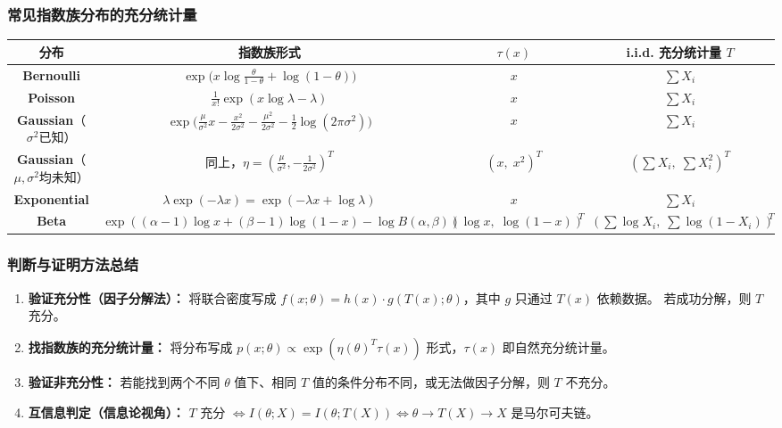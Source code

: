 \documentclass[12pt,a4paper]{ctexart}
\theoremstyle{definition}
\begin{document}
\subsubsection{常见指数族分布的充分统计量}

\begin{center}
\begin{tabular}{c|c|c|c}
\toprule
分布 & 指数族形式 & $\tau(x)$ & i.i.d. 充分统计量 $T$ \\
\midrule
\textbf{Bernoulli} & $\exp\!\big(x\log\frac{\theta}{1-\theta} + \log(1-\theta)\big)$ & $x$ & $\sum X_i$ \\
\textbf{Poisson} & $\frac{1}{x!}\exp(x\log\lambda - \lambda)$ & $x$ & $\sum X_i$ \\
\textbf{Gaussian}（$\sigma^2$已知） & $\exp\!\big(\frac{\mu}{\sigma^2}x - \frac{x^2}{2\sigma^2} - \frac{\mu^2}{2\sigma^2} - \frac{1}{2}\log(2\pi\sigma^2)\big)$ & $x$ & $\sum X_i$ \\
\textbf{Gaussian}（$\mu,\sigma^2$均未知） & 同上，$\eta = (\frac{\mu}{\sigma^2}, -\frac{1}{2\sigma^2})^T$ & $(x,\; x^2)^T$ & $(\sum X_i,\; \sum X_i^2)^T$ \\
\textbf{Exponential} & $\lambda\exp(-\lambda x) = \exp(-\lambda x + \log\lambda)$ & $x$ & $\sum X_i$ \\
\textbf{Beta} & $\exp((\alpha-1)\log x + (\beta-1)\log(1-x) - \log B(\alpha,\beta))$ & $(\log x,\; \log(1-x))^T$ & $(\sum\log X_i,\; \sum\log(1-X_i))^T$ \\
\bottomrule
\end{tabular}
\end{center}

\subsubsection{判断与证明方法总结}

\begin{enumerate}[label=\arabic*., leftmargin=*]
  \item \textbf{验证充分性（因子分解法）：}
  将联合密度写成 $f(x;\theta) = h(x) \cdot g(T(x); \theta)$，其中 $g$ 只通过 $T(x)$ 依赖数据。
  若成功分解，则 $T$ 充分。

  \item \textbf{找指数族的充分统计量：}
  将分布写成 $p(x;\theta) \propto \exp(\eta(\theta)^T\tau(x))$ 形式，$\tau(x)$ 即自然充分统计量。

  \item \textbf{验证非充分性：}
  若能找到两个不同 $\theta$ 值下、相同 $T$ 值的条件分布不同，或无法做因子分解，则 $T$ 不充分。

  \item \textbf{互信息判定（信息论视角）：}
  $T$ 充分 $\iff I(\theta; X) = I(\theta; T(X)) \iff \theta \to T(X) \to X$ 是马尔可夫链。
\end{enumerate}
\end{document}
